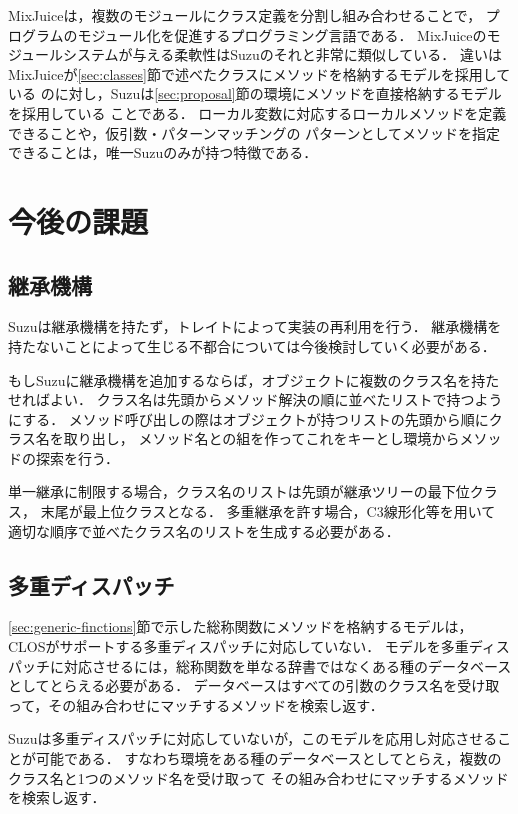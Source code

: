 \documentclass{ipsjprosym}
\begin{document}
MixJuice\cite{Ichisugi:2002}は，複数のモジュールにクラス定義を分割し組み合わせることで，
プログラムのモジュール化を促進するプログラミング言語である．
MixJuiceのモジュールシステムが与える柔軟性はSuzuのそれと非常に類似している．
違いはMixJuiceが\ref{sec:classes}節で述べたクラスにメソッドを格納するモデルを採用している
のに対し，Suzuは\ref{sec:proposal}節の環境にメソッドを直接格納するモデルを採用している
ことである．
ローカル変数に対応するローカルメソッドを定義できることや，仮引数・パターンマッチングの
パターンとしてメソッドを指定できることは，唯一Suzuのみが持つ特徴である．

\section{今後の課題}

\subsection{継承機構}

Suzuは継承機構を持たず，トレイトによって実装の再利用を行う．
継承機構を持たないことによって生じる不都合については今後検討していく必要がある．

もしSuzuに継承機構を追加するならば，オブジェクトに複数のクラス名を持たせればよい．
クラス名は先頭からメソッド解決の順に並べたリストで持つようにする．
メソッド呼び出しの際はオブジェクトが持つリストの先頭から順にクラス名を取り出し，
メソッド名との組を作ってこれをキーとし環境からメソッドの探索を行う．

単一継承に制限する場合，クラス名のリストは先頭が継承ツリーの最下位クラス，
末尾が最上位クラスとなる．
多重継承を許す場合，C3線形化\cite{Barrett:1996:MSL:236337.236343}等を用いて
適切な順序で並べたクラス名のリストを生成する必要がある．

\subsection{多重ディスパッチ}
\label{sec:multiple-dispatch}

\ref{sec:generic-finctions}節で示した総称関数にメソッドを格納するモデルは，
CLOSがサポートする多重ディスパッチに対応していない．
モデルを多重ディスパッチに対応させるには，総称関数を単なる辞書ではなくある種のデータベース
としてとらえる必要がある．
データベースはすべての引数のクラス名を受け取って，その組み合わせにマッチするメソッドを検索し返す．

Suzuは多重ディスパッチに対応していないが，このモデルを応用し対応させることが可能である．
すなわち環境をある種のデータベースとしてとらえ，複数のクラス名と1つのメソッド名を受け取って
その組み合わせにマッチするメソッドを検索し返す．
\end{document}

